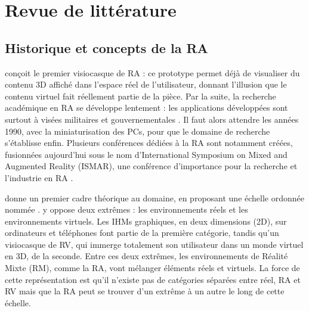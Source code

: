\chapter{Revue de littérature}
\label{ch:litterature}

\section{Historique et concepts de la RA}
\label{sec:litterature_ar_presentation}

\cite{Sutherland1968} conçoit le premier visiocasque de RA  : ce prototype permet déjà de visualiser du contenu 3D affiché dans l'espace réel de l'utilisateur, donnant l'illusion que le contenu virtuel fait réellement partie de la pièce. Par la suite, la recherche académique en RA se développe lentement : les applications développées sont surtout à visées militaires et gouvernementales \citep{VanKrevelen2010}. Il faut alors attendre les années 1990, avec la miniaturisation des PCs, pour que le domaine de recherche s'établisse enfin. Plusieurs conférences dédiées à la RA sont notamment créées, fusionnées aujourd'hui sous le nom d'International Symposium on Mixed and Augmented Reality (ISMAR), une conférence d'importance pour la recherche et l'industrie en RA \citep{Azuma2001}.


\cite{Milgram1994} donne un premier cadre théorique au domaine, en proposant une échelle ordonnée nommée  . \citeauthor{Milgram1994} y oppose deux extrêmes : les environnements réels et les environnements virtuels. Les IHMs graphiques, en deux dimensions (2D), sur ordinateurs et téléphones font partie de la première catégorie, tandis qu'un visiocasque de RV, qui immerge totalement son utilisateur dans un monde virtuel en 3D, de la seconde. Entre ces deux extrêmes, les environnements de Réalité Mixte (RM), comme la RA, vont mélanger éléments réels et virtuels. La force de cette représentation est qu'il n'existe pas de catégories séparées entre réel, RA et RV mais que la RA peut se trouver d'un extrême à un autre le long de cette échelle.

